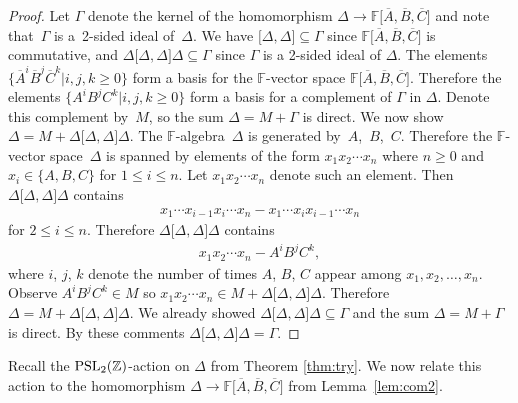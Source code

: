 \documentclass[pdftex]{sigma}
\numberwithin{equation}{section}
\begin{document}
\begin{proof}
Let $\Gamma$ denote the kernel of the
 homomorphism
$\Delta \to
\mathbb F\lbrack
\overline A,
\overline B,
\overline C
\rbrack $
 and note that~$\Gamma $ is a~2-sided ideal
 of~$\Delta $.
We have
$\lbrack \Delta ,\Delta \rbrack \subseteq \Gamma$
since
$
\mathbb F\lbrack
\overline A,
\overline B,
\overline C
\rbrack $ is commutative,
and
$\Delta \lbrack \Delta ,\Delta \rbrack \Delta
\subseteq \Gamma $
since
$\Gamma $ is a 2-sided ideal of $\Delta $.
The elements
$\lbrace \overline A^i \overline B^j \overline C^k |i,j,k\geq 0\rbrace $
form a  basis for the $\mathbb F$-vector space
$
\mathbb F\lbrack
\overline A,
\overline B,
\overline C
\rbrack $.
Therefore
the elements $\lbrace A^iB^jC^k |i,j,k\geq 0\rbrace$
form a basis for a complement of
$\Gamma $ in $\Delta $.
Denote this complement by~$M$, so
the sum
$\Delta =M+\Gamma $ is direct.
We now show $\Delta =M+
\Delta \lbrack \Delta ,\Delta \rbrack \Delta $.
The $\mathbb F$-algebra~$\Delta $
is generated by~$A$,~$B$,~$C$. Therefore
the $\mathbb F$-vector space~$\Delta $
is spanned by elements of the form
$x_1x_2\cdots x_n$ where $n\geq 0$ and
$x_i \in \lbrace A,B,C\rbrace$ for
$1 \leq i \leq n$.
Let
$x_1x_2\cdots x_n$ denote such
an element. Then
$\Delta \lbrack \Delta ,\Delta \rbrack \Delta $ contains
\begin{gather*}
x_1\cdots x_{i-1}x_i\cdots x_n  -
x_1\cdots x_ix_{i-1}\cdots x_n
\end{gather*}
for $2 \leq i \leq n$.
Therefore
$\Delta \lbrack \Delta ,\Delta \rbrack \Delta $ contains
\begin{gather*}
x_1x_2\cdots x_n  -  A^iB^j C^k,
\end{gather*}
where $i$, $j$, $k$ denote the number of
times $A$, $B$, $C$ appear among
$x_1, x_2,\ldots,  x_n$.
Observe $A^iB^jC^k \in M$ so
$x_1x_2\cdots x_n \in
M+
\Delta \lbrack \Delta ,\Delta \rbrack \Delta $.
Therefore
$\Delta =M+
\Delta \lbrack \Delta ,\Delta \rbrack \Delta $.
We already showed
$\Delta \lbrack \Delta ,\Delta \rbrack \Delta
\subseteq \Gamma $
and the sum
$\Delta =M+\Gamma $ is direct. By these comments
$\Delta \lbrack \Delta ,\Delta \rbrack \Delta
=\Gamma $.
\end{proof}



Recall
the ${\rm  {PSL}}_2(\mathbb Z)$-action on $\Delta $ from Theorem
\ref{thm:try}.
We now relate
this action
to the
homomorphism
$\Delta \to
\mathbb F\lbrack \overline A,\overline B, \overline C\rbrack$
from Lemma~\ref{lem:com2}.
\end{document}
